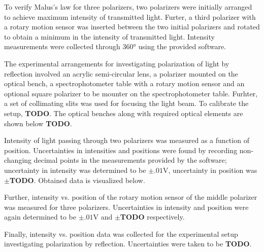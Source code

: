 \begin{paper}
	To verify Malus's law for three polarizers, two polarizers were initially arranged to achieve maximum intensity of transmitted light. Furter, a third polarizer with a rotary motion sensor was inserted between the two initial polarizers and rotated to obtain a minimum in the intensity of transmitted light. Intensity measurements were collected through \( 360 \si{\degree} \) using the provided software.
	
	The experimental arrangements for investigating polarization of light by reflection involved an acrylic semi-circular lens, a polarizer mounted on the optical bench, a spectrophotometer table with a rotary motion sensor and an optional square polarizer to be mounter on the spectrophotometer table. Furhter, a set of collimating slits was used for focusing the light beam. To calibrate the setup, \textbf{TODO}. The optical benches along with required optical elements are shown below \textbf{TODO}.
	
	
	Intensity of light passing through two polarizers was measured as a function of position. Uncertainties in intensities and positions were found by recording non-changing decimal points in the measurements provided by the software; uncertainty in intensity was determined to be \( \pm .01 \si{\volt} \), uncertainty in position was \( \pm \)\textbf{TODO}. Obtained data is visualized below.
		
	Further, intensity vs. position of the rotary motion sensor of the middle polarizer was measured for three polarizers. Uncertainties in intensity and position were again determined to be \( \pm .01 \si{\volt} \) and \( \pm \)\textbf{TODO} respectively.
	
	Finally, intensity vs. position data was collected for the experimental setup investigating polarization by reflection. Uncertainties were taken to be \textbf{TODO}. 
	
	

\end{paper}
